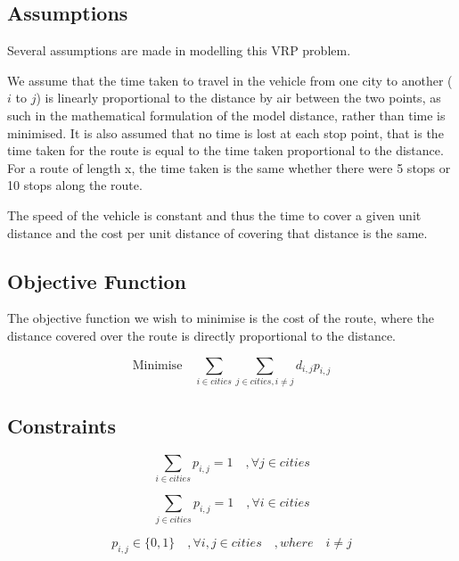\documentclass[a4paper,11pt]{article}
\begin{document}
\subsection{Assumptions}
Several assumptions are made in modelling this VRP problem.

We assume that the time taken to travel in the vehicle from one city to another ($i$ to $j$) is linearly proportional to the distance by air between the two points, as such in the mathematical formulation of the model distance, rather than time is minimised. It is also assumed that no time is lost at each stop point, that is the time taken for the route is equal to the time taken proportional to the distance. For a route of length x, the time taken is the same whether there were 5 stops or 10 stops along the route. 

The speed of the vehicle is constant and thus the time to cover a given unit distance and the cost per unit distance of covering that distance is the same.


\subsection{Objective Function}

The objective function we wish to minimise is the cost of the route, where the distance covered over the route is directly proportional to the distance. 

\begin{equation}\label{eq1}
\textrm{Minimise} \quad \sum\limits_{i \in cities} \sum\limits_{j \in cities, i \neq j} d_{i,j} p_{i,j}
\end{equation}

\subsection{Constraints}

\begin{equation}\label{eq2}
\sum\limits_{i \in cities} p_{i,j} = 1 \quad , \forall j \in cities
\end{equation}

\begin{equation}\label{eq3}
\sum\limits_{j \in cities} p_{i,j} = 1 \quad , \forall i \in cities
\end{equation}

\begin{equation}\label{eq4}
p_{i,j} \in{\{0,1\}} \quad , \forall i,j \in cities\quad, where \quad i \neq j
\end{equation}
\end{document}
